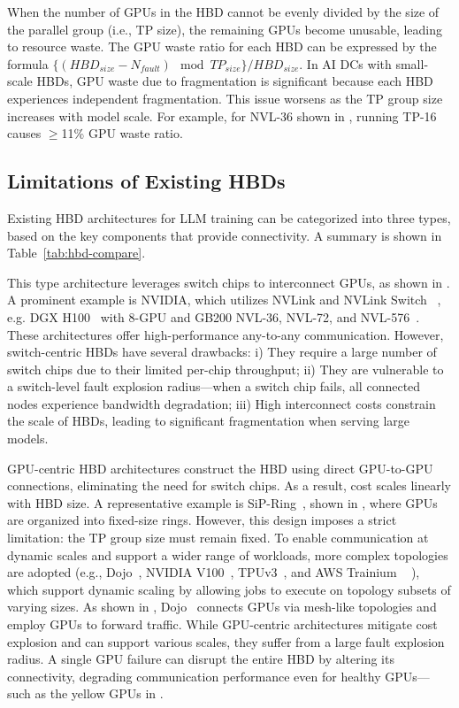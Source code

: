  When the number of GPUs in the HBD cannot be evenly divided by the size of the parallel group (i.e., TP size), the remaining GPUs become unusable, leading to resource waste.
The GPU waste ratio for each HBD can be expressed by the formula $\{(HBD_{size} - N_{fault}) \mod TP_{size}\}/{HBD_{size}}$.
In AI DCs with small-scale HBDs, GPU waste due to fragmentation is significant because each HBD experiences independent fragmentation.
This issue worsens as the TP group size increases with model scale. For example, for NVL-36 shown in , running TP-16 causes $\geq$11\% GPU waste ratio.



\subsection{Limitations of Existing HBDs} 
\label{sec:background:hbd}


Existing HBD architectures for LLM training can be categorized into three types, based on the key components that provide connectivity. A summary is shown in Table~\ref{tab:hbd-compare}.

This type architecture leverages switch chips to interconnect GPUs, as shown in .
A prominent example is NVIDIA, which utilizes NVLink and NVLink Switch ~\cite{nvlink,nvswitch}, e.g. DGX H100~\cite{dgx} with 8-GPU and GB200 NVL-36, NVL-72, and NVL-576~\cite{nvl72}. 
These architectures offer high-performance any-to-any communication.
However, switch-centric HBDs have several drawbacks: i) They require a large number of switch chips due to their limited per-chip throughput; ii) They are vulnerable to a switch-level fault explosion radius—when a switch chip fails, all connected nodes experience bandwidth degradation; iii) High interconnect costs constrain the scale of HBDs, leading to significant fragmentation when serving large models.

GPU-centric HBD architectures construct the HBD using direct GPU-to-GPU connections, eliminating the need for switch chips. As a result, cost scales linearly with HBD size.
A representative example is SiP-Ring~\cite{sip-ml}, shown in , where GPUs are organized into fixed-size rings. However, this design imposes a strict limitation: the TP group size must remain fixed. 
To enable communication at dynamic scales and support a wider range of workloads, more complex topologies are adopted (e.g., Dojo~\cite{dojo}, NVIDIA V100~\cite{v100},  TPUv3~\cite{cacm2020tpuv3}, and AWS Trainium ~\cite{aws-trainium} ), which support dynamic scaling by allowing jobs to execute on topology subsets of varying sizes. As shown in , Dojo~\cite{dojo} connects GPUs via mesh-like topologies and employ GPUs to forward traffic. While GPU-centric architectures mitigate cost explosion and can support various scales, they suffer from a large fault explosion radius. A single GPU failure can disrupt the entire HBD by altering its connectivity, degrading communication performance even for healthy GPUs—such as the yellow GPUs in .


